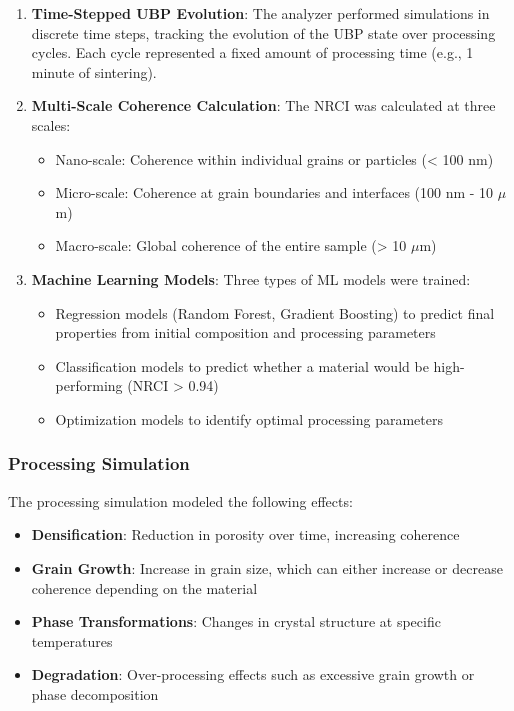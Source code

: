 \documentclass[11pt,a4paper]{article}
\begin{document}
\begin{enumerate}
    \item \textbf{Time-Stepped UBP Evolution}: The analyzer performed simulations in discrete time steps, tracking the evolution of the UBP state over processing cycles. Each cycle represented a fixed amount of processing time (e.g., 1 minute of sintering).
    
    \item \textbf{Multi-Scale Coherence Calculation}: The NRCI was calculated at three scales:
    \begin{itemize}
        \item Nano-scale: Coherence within individual grains or particles (< 100 nm)
        \item Micro-scale: Coherence at grain boundaries and interfaces (100 nm - 10 $\mu$m)
        \item Macro-scale: Global coherence of the entire sample (> 10 $\mu$m)
    \end{itemize}
    
    \item \textbf{Machine Learning Models}: Three types of ML models were trained:
    \begin{itemize}
        \item Regression models (Random Forest, Gradient Boosting) to predict final properties from initial composition and processing parameters
        \item Classification models to predict whether a material would be high-performing (NRCI > 0.94)
        \item Optimization models to identify optimal processing parameters
    \end{itemize}
\end{enumerate}

\subsubsection{Processing Simulation}

The processing simulation modeled the following effects:

\begin{itemize}
    \item \textbf{Densification}: Reduction in porosity over time, increasing coherence
    \item \textbf{Grain Growth}: Increase in grain size, which can either increase or decrease coherence depending on the material
    \item \textbf{Phase Transformations}: Changes in crystal structure at specific temperatures
    \item \textbf{Degradation}: Over-processing effects such as excessive grain growth or phase decomposition
\end{itemize}
\end{document}
